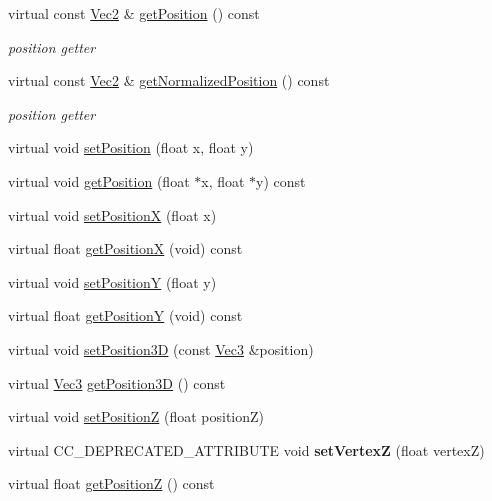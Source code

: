 \begin{Indent}
\begin{DoxyCompactItemize}
virtual const \hyperlink{classVec2}{Vec2} \& \hyperlink{classNode_a1c78c6feace91b27b6cbb12ee16e8eb0}{get\+Position} () const
\begin{DoxyCompactList}\small\item\em position getter \end{DoxyCompactList}\item 
virtual const \hyperlink{classVec2}{Vec2} \& \hyperlink{classNode_a9887ca06e6ecc7e19806927036bf8b57}{get\+Normalized\+Position} () const
\begin{DoxyCompactList}\small\item\em position getter \end{DoxyCompactList}\item 
virtual void \hyperlink{classNode_aaa8545c103ef1b35e5076dbedab93af5}{set\+Position} (float x, float y)
\item 
virtual void \hyperlink{classNode_a216f30e9a2dda896b2ffff1885b33a98}{get\+Position} (float $\ast$x, float $\ast$y) const
\item 
virtual void \hyperlink{classNode_ae1dfc73d6122a95778d5d9db3d1fd913}{set\+PositionX} (float x)
\item 
virtual float \hyperlink{classNode_ad4b27cd8bc98960789fbd2b574666a25}{get\+PositionX} (void) const
\item 
virtual void \hyperlink{classNode_a5c97d36655f0daa71a5f6c715d2b0470}{set\+PositionY} (float y)
\item 
virtual float \hyperlink{classNode_ae2ab411fb5477789b7b96477b18c0f83}{get\+PositionY} (void) const
\item 
virtual void \hyperlink{classNode_aa9eee02836d359b1469cf8a1484b485f}{set\+Position3D} (const \hyperlink{classVec3}{Vec3} \&position)
\item 
virtual \hyperlink{classVec3}{Vec3} \hyperlink{classNode_a8617dd2eb9af75a66ebaff0d3c99285e}{get\+Position3D} () const
\item 
virtual void \hyperlink{classNode_aaea9bcbb6e5972122c590b930b5a90b9}{set\+PositionZ} (float positionZ)
\item 
\mbox{\label{classNode_ae6caed983c3f8d7686ebd602bb27de08}} 
virtual C\+C\+\_\+\+D\+E\+P\+R\+E\+C\+A\+T\+E\+D\+\_\+\+A\+T\+T\+R\+I\+B\+U\+TE void {\bfseries set\+VertexZ} (float vertexZ)
\item 
virtual float \hyperlink{classNode_a0c6023aabdeeff9cf981ad81e6aaed9c}{get\+PositionZ} () const
\item 
\mbox{\label{classNode_af9e0714dcf9b018f0bfddc4e1d48257b}} 

\end{DoxyCompactItemize}
\end{Indent}
